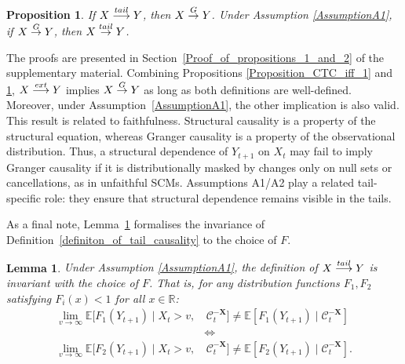 \documentclass[a4paper,11pt]{article}
\newtheorem{lemma}{Lemma}
\newtheorem{proposition}{Proposition}
\newcommand{\toverset}[2]{\overset{{\rm #1}}{#2}}
\begin{document}
\begin{proposition}\label{Proposition_Granger_equivalent_tail}
 If $\textbf{X}\toverset{tail}{\longrightarrow}\textbf{Y}$, then $\textbf{X}\toverset{G}{\to}\textbf{Y}$. Under Assumption \ref{AssumptionA1},  if $\textbf{X}\toverset{G}{\to}\textbf{Y}$, then $\textbf{X}\toverset{tail}{\to}\textbf{Y}$. 
\end{proposition}


The proofs are presented in Section~\ref{Proof_of_propositions_1_and_2} of the supplementary material. 
Combining Propositions \ref{Proposition_CTC_iff_1} and \ref{Proposition_Granger_equivalent_tail}, $\textbf{X}\toverset{ext}{\longrightarrow}\textbf{Y}$ implies $\textbf{X}\toverset{G}{\to}\textbf{Y}$ as long as both definitions are well-defined.  
Moreover, under Assumption~\ref{AssumptionA1}, the other implication is also valid. This result is related to faithfulness. Structural causality is a property of the
structural equation, whereas Granger causality is a property of the observational
distribution. Thus, a structural dependence of \(Y_{t+1}\) on \(X_t\) may fail to
imply Granger causality if it is distributionally masked by changes only on null sets or cancellations, as in unfaithful SCMs. Assumptions A1/A2 play a related tail-specific role: they ensure that structural
dependence remains visible in the tails.


As a final note, Lemma~\ref{lemma_o_invariance_about_F} formalises the invariance of Definition~\ref{definiton_of_tail_causality} to the choice of $F$.

\begin{lemma}\label{lemma_o_invariance_about_F}
Under Assumption \ref{AssumptionA1}, the definition of  $\textbf{X}\toverset{tail}{\longrightarrow}\textbf{Y}$ is invariant with the choice of $F$. That is, for any distribution functions $F_1, F_2$ satisfying $F_i(x)<1$ for all $x\in\mathbb{R}$:
\begin{equation*}
    \begin{split}
        \lim_{v\to\infty} \mathbb{E}[ F_1(Y_{t+1})\mid X_t>v,&  \, \mathcal{C}^{-\textbf{X}}_t]\neq\mathbb{E}[ F_1(Y_{t+1})\mid  \mathcal{C}^{-\textbf{X}}_t]\\
        & \iff \\
        \lim_{v\to\infty} \mathbb{E}[ F_2(Y_{t+1})\mid X_t>v,&\,  \mathcal{C}^{-\textbf{X}}_t]\neq\mathbb{E}[ F_2(Y_{t+1})\mid  \mathcal{C}^{-\textbf{X}}_t]. 
    \end{split}
\end{equation*}
\end{lemma}
\end{document}
